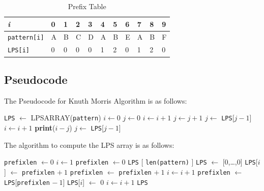 \documentclass[a4paper, 12pt]{report}
\begin{document}
        \begin{table}[h]
        \centering
        \begin{tabular}{l|l|l|l|l|l|l|l|l|l|l|}
        \cline{2-11}
        \textit{i}     & 0 & 1 & 2 & 3 & 4 & 5 & 6 & 7 & 8 & 9\\ \hline
        \texttt{pattern[i]} & A & B & C & D & A & B & E & A & B & F \\ \hline
        \texttt{LPS[i]}     &  0 & 0  & 0 & 0 & 1 & 2 & 0 & 1  & 2  & 0 \\ \hline
        \end{tabular}
        \caption{Prefix Table}
        \label{tab:Prefixtable3}
        \end{table}  
        
    
    \subsection{Pseudocode}
    

The Pseudocode for Knuth Morris Algorithm is as follows:
\newpage
\begin{algorithm}
    \begin{algorithmic}
      \State \texttt{LPS} $\gets $ LPSARRAY(\texttt{pattern})
      \State $i \gets 0$
      \State $j \gets 0$
      \State $i \gets i + 1$
      \State $j \gets j + 1$
      \Else
      \State $j \gets $ \texttt{LPS}[$j-1$]
      \Else
      \State $i \gets i +1$ 
      \EndIf
      \EndIf
      \State \textbf{print}($i-j$)
      \State  $j \gets$ \texttt{LPS}[$j-1$]
      \EndIf
      \EndWhile
    \EndProcedure
    \end{algorithmic}
    \end{algorithm}
    \newpage
    The algorithm to compute the LPS array is as follows:
    \begin{algorithm}
\begin{algorithmic}
  \State \texttt{prefixlen} $\gets 0$
  \State  $i \gets 1$
  \State \texttt{prefixlen} $\gets 0$
  \State \texttt{LPS} [ \texttt{len(pattern)} ]
  \State \texttt{LPS} $\gets$ [0,\dots,0]
    \State \texttt{LPS}[$i$] $\gets $ \texttt{prefixlen} $+\ 1$
    \State \texttt{prefixlen} $\gets $ \texttt{prefixlen} $+\ 1$
    \State $i \gets  i+1$
    \Else
    \State \texttt{prefixlen} $\gets$ \texttt{LPS}[\texttt{prefixlen} $-\ 1$]
    \Else
    \State \texttt{LPS}[$i$] $\gets$ 0
    \State $i \gets i+1$
    \EndIf
\EndIf
  \EndWhile
  \State \Return \texttt{LPS}
\EndFunction
\end{algorithmic}
\end{algorithm}
\end{document}
